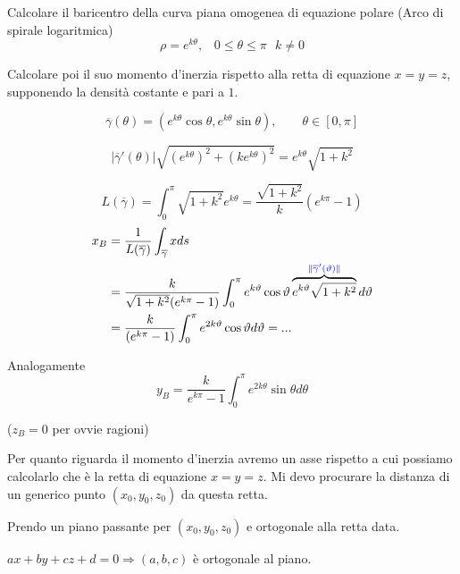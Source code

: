 \begin{exbar}
\begin{example}
	Calcolare il baricentro della curva piana omogenea di equazione polare {\color{blue}(Arco di spirale logaritmica)}
	\begin{equation*}
		\rho=e^{k\theta}, \,\,\,\, \, 0 \leq \theta \leq \pi\,\,\,\, k \neq 0
	\end{equation*}
	
	Calcolare poi il suo momento d'inerzia rispetto alla retta di equazione $x=y=z$, supponendo la densità costante e pari a $1$.
	
	
	$$\overline{\gamma}(\theta)=(e^{k\theta}\cos \theta, e^{k\theta}\sin \theta), \qquad \theta \in [0,\pi]$$
	
	$$|\overline{\gamma}'(\theta)|\sqrt{(e^{k\theta})^2+(ke^{k\theta})^2}=e^{k\theta}\sqrt{1+k^2}$$
	
	$$L(\overline{\gamma})=\int_0^{\pi} \sqrt{1+k^2}e^{k\theta}=\frac{\sqrt{1+k^2}}{k}(e^{k\pi}-1)$$
	\begin{align*}
		x_B&=\frac{1}{L(\overline{\gamma})}\int_{\overline{\gamma}} x ds\\
		&= \frac{k}{\sqrt{1+k^2}(e^{k\pi}-1)}\int_0^\pi e^{k\theta} \cos \theta \overbrace{e^{k\theta}\sqrt{1+k^2}}^{{\color{blue} \|\overline{\gamma}'(\theta)\|}} d\theta\\
		&=\frac{k}{(e^{k\pi}-1)}\int_0^\pi e^{2k\theta} \cos \theta d \theta=...
	\end{align*}
	
	Analogamente
	\begin{equation*}
		y_B= \frac{k}{e^{k\pi}-1}\int_0^\pi e^{2k \theta} \sin \theta d \theta
	\end{equation*}
	
	{\color{blue}($z_B=0$ per ovvie ragioni)}
	
	Per quanto riguarda il momento d'inerzia avremo un asse rispetto a cui possiamo calcolarlo che è la retta di equazione $x=y=z$. Mi devo procurare la distanza di un generico punto $(x_0,y_0,z_0)$ da questa retta.


	{\color{red}Prendo un piano passante per $(x_0,y_0,z_0)$ e ortogonale alla retta data.}
	
	{\color{teal}$ax+by+cz+d=0 \Rightarrow (a,b,c)$ è ortogonale al piano.}
	

\end{example}
\end{exbar}

